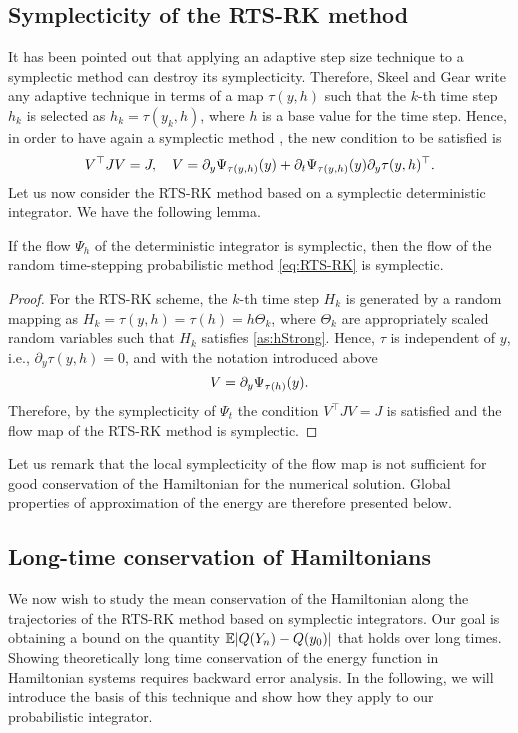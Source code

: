 \documentclass[10pt]{article}
\begin{document}
\subsection{Symplecticity of the RTS-RK method} It has been pointed out \cite[Section VIII.1]{HLW06} that applying an adaptive step size technique to a symplectic method can destroy its symplecticity. Therefore, Skeel and Gear \cite{SkG92} write any adaptive technique in terms of a map $\tau(y, h)$ such that the $k$-th time step $h_k$ is selected as $h_k = \tau(y_k, h)$, where $h$ is a base value for the time step. Hence, in order to have again a symplectic method , the new condition to be satisfied is
\begin{equation}\label{eq:SymplecticCondition}
V^\top J V = J, \quad V = \pdv{\Psi_{\tau(y, h)}(y)}{y} + \pdv{\Psi_{\tau(y, h)}(y)}{t}\pdv{\tau(y, h)}{y}^\top.
\end{equation}
Let us now consider the RTS-RK method based on a symplectic deterministic integrator. We have the following lemma. 
\begin{lemma}\label{lem:SympRTSRK} If the flow $\Psi_h$ of the deterministic integrator is symplectic, then the flow of the random time-stepping probabilistic method \eqref{eq:RTS-RK} is symplectic.
\end{lemma}
\begin{proof} For the RTS-RK scheme, the $k$-th time step $H_k$ is generated by a random mapping as $H_k = \tau(y, h) = \tau(h) = h\Theta_k$, where $\Theta_k$ are appropriately scaled random variables such that $H_k$ satisfies \cref{as:hStrong}. Hence, $\tau$ is independent of $y$, i.e., $\partial_y \tau(y, h) = 0$, and with the notation introduced above 
	\begin{equation}
	V = \pdv{\Psi_{\tau(h)}(y)}{y}.
	\end{equation}
	Therefore, by the symplecticity of $\Psi_t$ the condition $V^\top J V = J$ is satisfied and the flow map of the RTS-RK method is symplectic.
\end{proof}
Let us remark that the local symplecticity of the flow map is not sufficient for good conservation of the Hamiltonian for the numerical solution. Global properties of approximation of the energy are therefore presented below.

\subsection{Long-time conservation of Hamiltonians}\label{sec:Hamiltonian_2} We now wish to study the mean conservation of the Hamiltonian along the trajectories of the RTS-RK method based on symplectic integrators. Our goal is obtaining a bound on the quantity $\E\abs{Q(Y_n) - Q(y_0)}$ that holds over long times. Showing theoretically long time conservation of the energy function in Hamiltonian systems requires backward error analysis. In the following, we will introduce the basis of this technique and show how they apply to our probabilistic integrator. 
\end{document}
